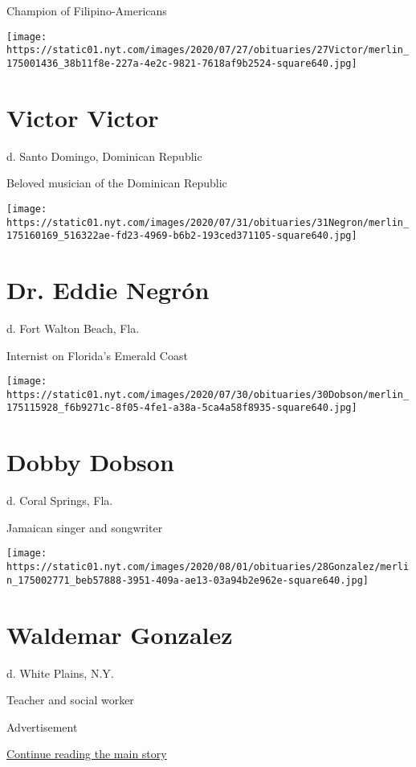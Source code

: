 Champion of Filipino-Americans

\texttt{[image: https://static01.nyt.com/images/2020/07/27/obituaries/27Victor/merlin\_175001436\_38b11f8e-227a-4e2c-9821-7618af9b2524-square640.jpg]}

\hypertarget{victor-victor}{%
\section{Victor Victor}\label{victor-victor}}

d. Santo Domingo, Dominican Republic

Beloved musician of the Dominican Republic

\texttt{[image: https://static01.nyt.com/images/2020/07/31/obituaries/31Negron/merlin\_175160169\_516322ae-fd23-4969-b6b2-193ced371105-square640.jpg]}

\hypertarget{dr-eddie-negruxf3n}{%
\section{Dr. Eddie Negrón}\label{dr-eddie-negruxf3n}}

d. Fort Walton Beach, Fla.

Internist on Florida's Emerald Coast

\texttt{[image: https://static01.nyt.com/images/2020/07/30/obituaries/30Dobson/merlin\_175115928\_f6b9271c-8f05-4fe1-a38a-5ca4a58f8935-square640.jpg]}

\hypertarget{dobby-dobson}{%
\section{Dobby Dobson}\label{dobby-dobson}}

d. Coral Springs, Fla.

Jamaican singer and songwriter

\texttt{[image: https://static01.nyt.com/images/2020/08/01/obituaries/28Gonzalez/merlin\_175002771\_beb57888-3951-409a-ae13-03a94b2e962e-square640.jpg]}

\hypertarget{waldemar-gonzalez}{%
\section{Waldemar Gonzalez}\label{waldemar-gonzalez}}

d. White Plains, N.Y.

Teacher and social worker

Advertisement

\protect\hyperlink{after-bottom}{Continue reading the main story}

